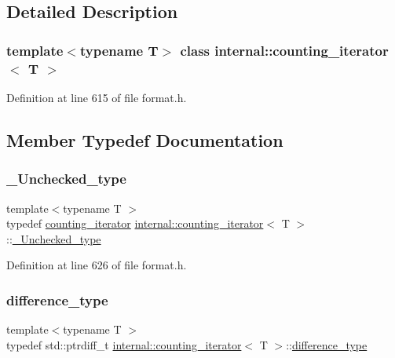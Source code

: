 \subsection{Detailed Description}
\subsubsection*{template$<$typename T$>$\newline
class internal\+::counting\+\_\+iterator$<$ T $>$}



Definition at line 615 of file format.\+h.



\subsection{Member Typedef Documentation}
\mbox{\label{classinternal_1_1counting__iterator_ab0bb803614313da57e902e8f5ac2095d}} 
\subsubsection{\texorpdfstring{\+\_\+\+Unchecked\+\_\+type}{\_Unchecked\_type}}
{\footnotesize\ttfamily template$<$typename T $>$ \\
typedef \hyperlink{classinternal_1_1counting__iterator}{counting\+\_\+iterator} \hyperlink{classinternal_1_1counting__iterator}{internal\+::counting\+\_\+iterator}$<$ T $>$\+::\hyperlink{classinternal_1_1counting__iterator_ab0bb803614313da57e902e8f5ac2095d}{\+\_\+\+Unchecked\+\_\+type}}



Definition at line 626 of file format.\+h.

\mbox{\label{classinternal_1_1counting__iterator_a9b409b0895044059511e67a9fb46aff4}} 
\subsubsection{\texorpdfstring{difference\+\_\+type}{difference\_type}}
{\footnotesize\ttfamily template$<$typename T $>$ \\
typedef std\+::ptrdiff\+\_\+t \hyperlink{classinternal_1_1counting__iterator}{internal\+::counting\+\_\+iterator}$<$ T $>$\+::\hyperlink{classinternal_1_1counting__iterator_a9b409b0895044059511e67a9fb46aff4}{difference\+\_\+type}}



